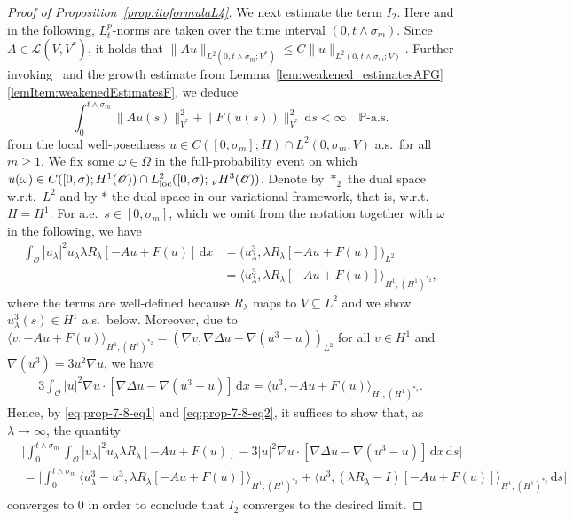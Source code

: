 \documentclass[reqno]{amsart}
\newcommand{\sL}{\mathscr{L}}
\newcommand{\sO}{\mathscr{O}}
\newcommand{\seq}{\subseteq}
\newcommand{\1}{\mathbf{1}}
\newcommand{\grad}{\nabla}
\newcommand{\ds}{\,\mathrm{d}s}
\newcommand{\dx}{\,\mathrm{d}x}
\newcommand{\inttm}{\int_0^{t\wedge\sigma_m}}
\newcommand{\loc}{\textup{loc}}
\newcommand{\nH}{\ensuremath{\,_\nu H}}
\begin{document}
\begin{proof}[Proof of Proposition~\ref{prop:itoformulaL4}]
We next estimate the term $I_2$. Here and in the following, $L_t^p$-norms are taken over the time interval $(0,t\land\sigma_m)$.  Since $A\in \sL(V, V^\ast)$, it holds that $\|Au\|_{L^2(0,t\land \sigma_m;V^\ast)}\le C \|u\|_{L^2(0,t\land \sigma_m;V)}$. Further invoking~\cite[Remark~4.2]{agrestiNonlinearSPDEsMaximal2025} and the growth estimate from Lemma~\ref{lem:weakened_estimatesAFG}\ref{lemItem:weakenedEstimatesF}, we deduce
    \begin{equation}
    \label{eq:globalWellposedness-verifyIto1}
        \inttm \|Au(s)\|^2_{V^\ast} + \|F(u(s))\|^2_{V^\ast} \ds <\infty\quad \mathbb{P}\text{-a.s.}
    \end{equation}
    from the local well-posedness $u\in C([0,\sigma_m];H)\cap L^2(0,\sigma_m;V)$ a.s.\ for all $m\ge 1$. We fix some $\omega \in \Omega$ in the full-probability event on which $u(\omega)\in C([0,\sigma);H^1(\sO))\cap L^2_{\loc}([0,\sigma);\nH^3(\sO))$. Denote by $\ast_2$ the dual space w.r.t.\ $L^2$ and by $\ast$ the dual space in our variational framework, that is, w.r.t.\ $H=H^1$. For a.e.\ $s\in [0,\sigma_m]$, which we omit from the notation together with $\omega$ in the following, we have
\begin{align}
    \int_{\sO} |u_\lambda|^2 u_\lambda
    \lambda R_\lambda[-Au+ F(u)]\dx&= \big( u_\lambda^3, \lambda R_\lambda[-Au+ F(u)] \big)_{L^2}\nonumber \\
    &= \big\langle u_\lambda^3, \lambda R_\lambda[-Au+ F(u)] \big\rangle_{H^1,(H^1)^{\ast_2}},\label{eq:prop-7-8-eq1}
\end{align}
where the terms are well-defined because $R_\lambda$ maps to $V\seq L^2$ and we show $u_\lambda^3(s)\in H^1$ a.s.\ below. Moreover, due to $\langle v,-Au+F(u)\rangle_{H^1,(H^1)^{\ast_2}}= (\grad v, \grad\Delta u-\grad(u^3-u))_{L^2}$ for all $v\in H^1$ and $\grad(u^3)=3u^2\grad u$, we have
\begin{align}\label{eq:prop-7-8-eq2}
    3\int_{\sO} |u|^2 \grad u \cdot [\grad\Delta u- \grad(u^3-u)]\dx
    =\langle u^3, -Au+ F(u)\rangle_{H^1,(H^1)^{\ast_2}}.
\end{align}
Hence, by \eqref{eq:prop-7-8-eq1} and \eqref{eq:prop-7-8-eq2}, it suffices to show that, as $\lambda \to \infty$, the quantity
\begin{equation}\label{eq:Lemma311-I3}
\begin{aligned}
	&\Big| \inttm \int_{\sO} |u_\lambda|^2 u_\lambda 
    \lambda R_\lambda[-Au+ F(u)]-3|u|^2 \grad u\cdot[\grad\Delta u- \grad(u^3-u)]\dx\ds \Big|\\
    &= \Big|\inttm  \big\langle u_\lambda^3-u^3, \lambda R_\lambda[-Au+ F(u)] \big\rangle_{H^1,(H^1)^{\ast_2}}
    + \big\langle u^3, (\lambda R_\lambda-I)[-Au+ F(u)] \big\rangle_{H^1,(H^1)^{\ast_2}} \ds\Big|
\end{aligned}
\end{equation}
converges to $0$ in order to conclude that $I_2$ converges to the desired limit. 


\end{proof}
\end{document}

